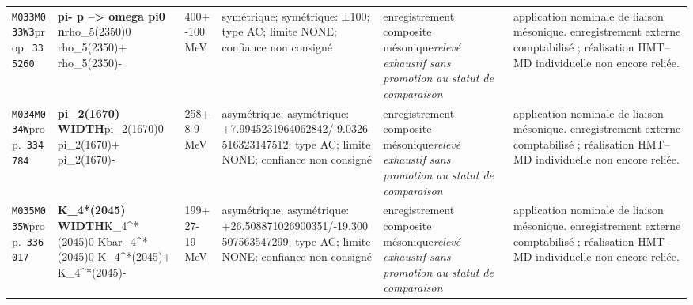 \begin{landscape}
\begin{longtable}{L{1.85cm}L{4.45cm}L{2.35cm}L{4.05cm}L{3.35cm}L{7.15cm}}
\texttt{M033}\newline \texttt{M033W3}\newline prop.\ \texttt{335260} & \textbf{pi- p --\textgreater{} omega pi0 n}\newline rho\_\allowbreak{}5(2350)0 \textbar{}\allowbreak{} rho\_\allowbreak{}5(2350)+ \textbar{}\allowbreak{} rho\_\allowbreak{}5(2350)- & 400+-100\,MeV & symétrique; symétrique: ±100; type AC; limite NONE; confiance non consigné & enregistrement composite mésonique\newline \emph{relevé exhaustif sans promotion au statut de comparaison} & application nominale de liaison mésonique. enregistrement externe comptabilisé ; réalisation HMT--MD individuelle non encore reliée. \\
\texttt{M034}\newline \texttt{M034W}\newline prop.\ \texttt{334784} & \textbf{pi\_\allowbreak{}2(1670) WIDTH}\newline pi\_\allowbreak{}2(1670)0 \textbar{}\allowbreak{} pi\_\allowbreak{}2(1670)+ \textbar{}\allowbreak{} pi\_\allowbreak{}2(1670)- & 258+8-9\,MeV & asymétrique; asymétrique: +7.9945231964062842/-9.0326516323147512; type AC; limite NONE; confiance non consigné & enregistrement composite mésonique\newline \emph{relevé exhaustif sans promotion au statut de comparaison} & application nominale de liaison mésonique. enregistrement externe comptabilisé ; réalisation HMT--MD individuelle non encore reliée. \\
\texttt{M035}\newline \texttt{M035W}\newline prop.\ \texttt{336017} & \textbf{K\_\allowbreak{}4*(2045) WIDTH}\newline K\_\allowbreak{}4\textasciicircum{}*(2045)0 \textbar{}\allowbreak{} Kbar\_\allowbreak{}4\textasciicircum{}*(2045)0 \textbar{}\allowbreak{} K\_\allowbreak{}4\textasciicircum{}*(2045)+ \textbar{}\allowbreak{} K\_\allowbreak{}4\textasciicircum{}*(2045)- & 199+27-19\,MeV & asymétrique; asymétrique: +26.508871026900351/-19.300507563547299; type AC; limite NONE; confiance non consigné & enregistrement composite mésonique\newline \emph{relevé exhaustif sans promotion au statut de comparaison} & application nominale de liaison mésonique. enregistrement externe comptabilisé ; réalisation HMT--MD individuelle non encore reliée. \\

\end{longtable}
\end{landscape}
